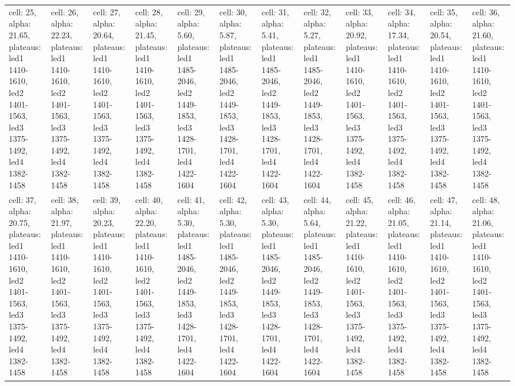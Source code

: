 \documentclass{article}
\begin{document}
\begin{landscape}
\begin{longtable}{|p{1.5cm}|p{1.5cm}|p{1.5cm}|p{1.5cm}|p{1.5cm}|p{1.5cm}|p{1.5cm}|p{1.5cm}|p{1.5cm}|p{1.5cm}|p{1.5cm}|p{1.5cm}|}
\rowcolor{lightgray} cell: 25, alpha: 21.65, plateaus: led1 1410-1610, led2 1401-1563, led3 1375-1492, led4 1382-1458 &cell: 26, alpha: 22.23, plateaus: led1 1410-1610, led2 1401-1563, led3 1375-1492, led4 1382-1458 &cell: 27, alpha: 20.64, plateaus: led1 1410-1610, led2 1401-1563, led3 1375-1492, led4 1382-1458 &cell: 28, alpha: 21.45, plateaus: led1 1410-1610, led2 1401-1563, led3 1375-1492, led4 1382-1458 &cell: 29, alpha: 5.60, plateaus: led1 1485-2046, led2 1449-1853, led3 1428-1701, led4 1422-1604 &cell: 30, alpha: 5.87, plateaus: led1 1485-2046, led2 1449-1853, led3 1428-1701, led4 1422-1604 &cell: 31, alpha: 5.41, plateaus: led1 1485-2046, led2 1449-1853, led3 1428-1701, led4 1422-1604 &cell: 32, alpha: 5.27, plateaus: led1 1485-2046, led2 1449-1853, led3 1428-1701, led4 1422-1604 &cell: 33, alpha: 20.92, plateaus: led1 1410-1610, led2 1401-1563, led3 1375-1492, led4 1382-1458 &cell: 34, alpha: 17.34, plateaus: led1 1410-1610, led2 1401-1563, led3 1375-1492, led4 1382-1458 &cell: 35, alpha: 20.54, plateaus: led1 1410-1610, led2 1401-1563, led3 1375-1492, led4 1382-1458 &cell: 36, alpha: 21.60, plateaus: led1 1410-1610, led2 1401-1563, led3 1375-1492, led4 1382-1458 \\
cell: 37, alpha: 20.75, plateaus: led1 1410-1610, led2 1401-1563, led3 1375-1492, led4 1382-1458 &cell: 38, alpha: 21.97, plateaus: led1 1410-1610, led2 1401-1563, led3 1375-1492, led4 1382-1458 &cell: 39, alpha: 20.23, plateaus: led1 1410-1610, led2 1401-1563, led3 1375-1492, led4 1382-1458 &cell: 40, alpha: 22.20, plateaus: led1 1410-1610, led2 1401-1563, led3 1375-1492, led4 1382-1458 &cell: 41, alpha: 5.30, plateaus: led1 1485-2046, led2 1449-1853, led3 1428-1701, led4 1422-1604 &cell: 42, alpha: 5.30, plateaus: led1 1485-2046, led2 1449-1853, led3 1428-1701, led4 1422-1604 &cell: 43, alpha: 5.30, plateaus: led1 1485-2046, led2 1449-1853, led3 1428-1701, led4 1422-1604 &cell: 44, alpha: 5.64, plateaus: led1 1485-2046, led2 1449-1853, led3 1428-1701, led4 1422-1604 &cell: 45, alpha: 21.22, plateaus: led1 1410-1610, led2 1401-1563, led3 1375-1492, led4 1382-1458 &cell: 46, alpha: 21.05, plateaus: led1 1410-1610, led2 1401-1563, led3 1375-1492, led4 1382-1458 &cell: 47, alpha: 21.14, plateaus: led1 1410-1610, led2 1401-1563, led3 1375-1492, led4 1382-1458 &cell: 48, alpha: 21.06, plateaus: led1 1410-1610, led2 1401-1563, led3 1375-1492, led4 1382-1458 \\

\end{longtable}
\end{landscape}
\end{document}
